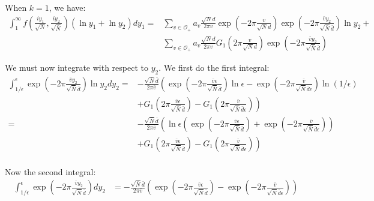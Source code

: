 \documentclass{article}
\theoremstyle{plain}
\begin{document}
{When $k=1$, we have:
\begin{align*}
\int_{1}^{\infty} f\left(\frac{iy_1}{\sqrt{N}},\frac{iy_2}{\sqrt{\bar{N}}}\right) (\ln y_1+\ln y_2) dy_1
= & \sum_{v \in \mathcal{O}_+} a_v \frac{\sqrt{N}d}{2 \pi v} \exp\left( -2\pi \frac{v}{\sqrt{N} d}\right)  \exp \left( -2\pi \frac{\bar{v} y_2}{\sqrt{\bar{N}}\bar{d}}\right) \ln y_2 + \\
& \sum_{v \in \mathcal{O}_+} a_v \frac{\sqrt{N}d}{2 \pi v} G_1\left( 2\pi \frac{v}{\sqrt{N} d}\right) \exp \left( -2\pi \frac{\bar{v} y_2}{\sqrt{\bar{N}}\bar{d}}\right)
\end{align*}

We must now integrate with respect to $y_2$. We first do the first integral:
\begin{align*}
\int_{1/\epsilon}^{\epsilon} \exp \left( -2\pi \frac{\bar{v} y_2}{\sqrt{\bar{N}}\bar{d}}\right) \ln y_2 dy_2
 = & -\frac{\sqrt{\bar{N}}\bar{d}}{2 \pi\bar{v}} \left( \exp \left( -2\pi \frac{\bar{v} \epsilon}{\sqrt{\bar{N}}\bar{d}}\right) \ln \epsilon -  \exp \left( -2\pi \frac{\bar{v} }{\sqrt{\bar{N}}\bar{d}\epsilon}\right) \ln(1/\epsilon) \right. \\
 & + \left. G_1\left(2\pi \frac{\bar{v} \epsilon}{\sqrt{\bar{N}}\bar{d}}\right)-G_1\left( 2\pi \frac{\bar{v} }{\sqrt{\bar{N}}\bar{d}\epsilon}\right) \right)\\
= & -\frac{\sqrt{\bar{N}}\bar{d}}{2 \pi\bar{v}} \left( \ln \epsilon \left( \exp \left( -2\pi \frac{\bar{v} \epsilon}{\sqrt{\bar{N}}\bar{d}}\right) +  \exp \left( -2\pi \frac{\bar{v} }{\sqrt{\bar{N}}\bar{d}\epsilon}\right) \right) \right. \\
 & + \left. G_1\left(2\pi \frac{\bar{v} \epsilon}{\sqrt{\bar{N}}\bar{d}}\right)-G_1\left( 2\pi \frac{\bar{v} }{\sqrt{\bar{N}}\bar{d}\epsilon}\right) \right)\\
\end{align*}

Now the second integral:
\begin{align*}
\int_{1/ \epsilon}^{\epsilon} \exp \left( -2\pi \frac{\bar{v} y_2}{\sqrt{\bar{N}}\bar{d}}\right) dy_2 
& =  - \frac{\sqrt{\bar{N}}\bar{d}}{2 \pi \bar{v}} \left( \exp \left( -2\pi \frac{\bar{v} \epsilon}{\sqrt{\bar{N}}\bar{d}}\right) -  \exp \left( -2\pi \frac{\bar{v} }{\sqrt{\bar{N}}\bar{d}\epsilon}\right)\right)
\end{align*}

}
\end{document}
